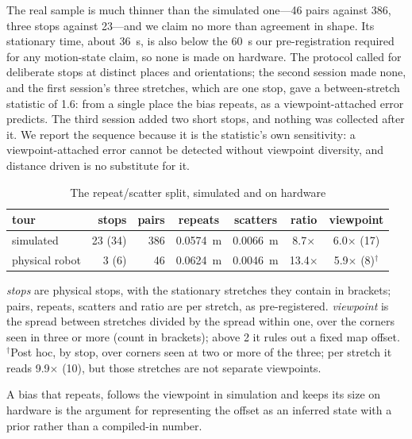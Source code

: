 \documentclass[conference,letterpaper,10pt]{IEEEtran}
\begin{document}
The real sample is much thinner than the simulated one---\num{46} pairs against \num{386}, three
stops against \num{23}---and we claim no more than agreement in shape. Its stationary time, about
\SI{36}{\second}, is also below the \SI{60}{\second} our pre-registration required for any
motion-state claim, so none is made on hardware. The protocol called for deliberate
stops at distinct places and orientations; the second session made none, and the first session's
three stretches, which are one stop, gave a between-stretch statistic of \num{1.6}: from a single
place the bias repeats, as a viewpoint-attached error predicts. The third session added two short
stops, and nothing was collected after it. We report the sequence because it
is the statistic's own sensitivity: a viewpoint-attached error cannot be detected without viewpoint
diversity, and distance driven is no substitute for it.

\begin{table}[t]
\centering
\caption{The repeat/scatter split, simulated and on hardware}
\label{tab:realtour}
\setlength{\tabcolsep}{3pt}
\footnotesize
\begin{tabular}{lrrcccc}
\toprule
tour & stops & pairs & repeats & scatters & ratio & viewpoint \\
\midrule
simulated      & 23 (34) & 386 & \SI{0.0574}{\meter} & \SI{0.0066}{\meter} & \num{8.7}$\times$ & \num{6.0}$\times$ (17) \\
physical robot & 3 (6)  & 46  & \SI{0.0624}{\meter} & \SI{0.0046}{\meter} & \num{13.4}$\times$ & \num{5.9}$\times$ (8)$^\dagger$ \\
\bottomrule
\end{tabular}

\vspace{2pt}
\begin{minipage}{\columnwidth}
\footnotesize
\emph{stops} are physical stops, with the stationary stretches they contain in brackets; pairs, repeats,
scatters and ratio are per stretch, as pre-registered. \emph{viewpoint} is the spread between
stretches divided by the spread within one, over the corners seen in three or more (count in brackets);
above \num{2} it rules out a fixed map offset. $^\dagger$Post hoc, by stop, over corners seen at two
or more of the three; per stretch it reads \num{9.9}$\times$ (10), but those stretches are not
separate viewpoints.
\end{minipage}
\end{table}

A bias that repeats, follows the viewpoint in simulation and keeps its size on hardware is the argument for
representing the offset as an inferred state
with a prior rather than a compiled-in number.
\end{document}
